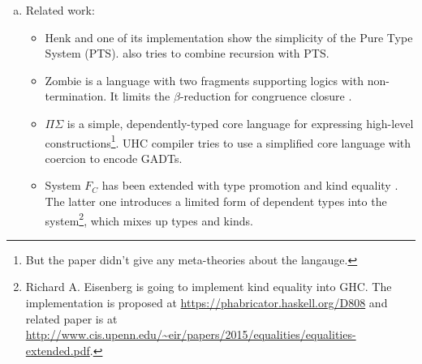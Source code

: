 \begin{enumerate}[a)]
\item Related work:

\begin{itemize}
\item Henk \cite{pts:henk} and one of its implementation \cite{pts:fp} show the simplicity of the Pure Type System (PTS). \cite{pts:rec} also tries to combine recursion with PTS.

\item \textsf{Zombie} \cite{zombie:popl14, zombie:thesis} is a language with two fragments supporting logics with non-termination. It limits the $\beta$-reduction for congruence closure \cite{zombie:popl15}.

\item $\Pi\Sigma$ \cite{dep:pisigma} is a simple, dependently-typed core language for expressing high-level constructions\footnote{But the paper didn't give any meta-theories about the langauge.}. UHC compiler \cite{fc:uhc} tries to use a simplified core language with coercion to encode GADTs.

\item System $F_C$ \cite{fc} has been extended with type promotion \cite{fc:pro} and kind equality \cite{fc:kind}. The latter one introduces a limited form of dependent types into the system\footnote{Richard A. Eisenberg is going to implement kind equality \cite{fc:kind} into GHC. The implementation is proposed at \url{https://phabricator.haskell.org/D808} and related paper is at \url{http://www.cis.upenn.edu/~eir/papers/2015/equalities/equalities-extended.pdf}.}, which mixes up types and kinds.
\end{itemize}

\end{enumerate}